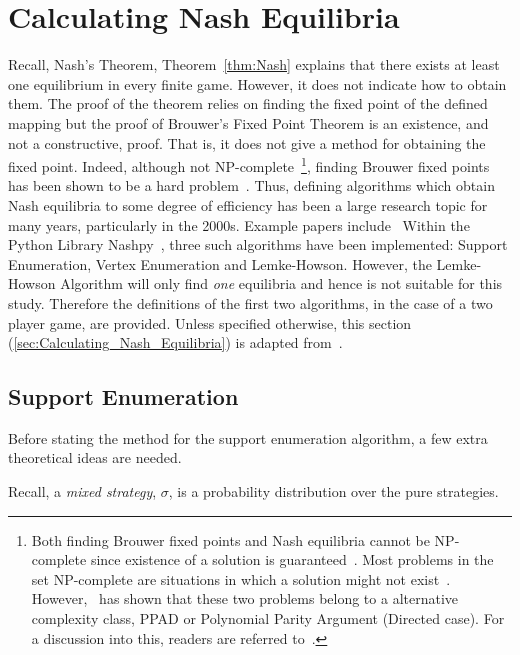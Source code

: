 \section{Calculating Nash Equilibria}\label{sec:Calculating_Nash_Equilibria}
Recall, Nash's Theorem, Theorem~\autoref{thm:Nash}
explains that there exists at least one equilibrium in every finite game.
However, it does not indicate how to obtain them. The proof of the theorem
relies on finding the fixed point of the defined mapping but the proof of
Brouwer's Fixed Point Theorem is an existence, and not a constructive, proof.
That is, it does not give a method for obtaining the fixed point. Indeed,
although not NP-complete~\footnote{Both finding Brouwer fixed points and Nash
equilibria cannot be NP-complete since existence of a solution is
guaranteed~\cite{NoamNisan2007}. Most problems in the set NP-complete are situations in which
a solution might not exist~\cite{NoamNisan2007}. However,~\cite{papadimitriou1994complexity} has shown that these two
problems belong to a alternative complexity class, PPAD or Polynomial Parity
Argument (Directed case). For a discussion into this, readers are referred to~\cite{papadimitriou1994complexity}.}, finding Brouwer fixed points has been shown to be a 
hard problem~\cite{Hirsch1989,papadimitriou1994complexity}. Thus, defining algorithms which obtain Nash equilibria to
some degree of efficiency has been a large research topic for many years,
particularly in the 2000s. Example papers include~\cite{Bossea,Chen2006,Gilpina,Govindan2003,Kontogiannis2006,Krawczyk2000,Littman2005} Within the Python Library Nashpy~\cite{axelrodproject}, three
such algorithms have been
implemented: Support Enumeration, Vertex Enumeration and Lemke-Howson. However,
the Lemke-Howson Algorithm will only find \textit{one} equilibria and hence is not
suitable for this study. Therefore the definitions of the first two algorithms,
in the case of a two player game, are provided. Unless specified otherwise, this
section (\autoref{sec:Calculating_Nash_Equilibria}) is adapted from~\cite{NoamNisan2007}.


\subsection{Support Enumeration}\label{subsec:Support_Enumeration}
Before stating the method for the support enumeration algorithm, a few extra
theoretical ideas are needed. 

Recall, a \textit{mixed strategy}, \(\sigma \), is a probability distribution
over the pure strategies.

